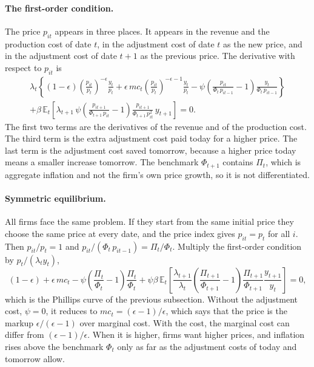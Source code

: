 \documentclass[11pt]{article}
\begin{document}
\paragraph{The first-order condition.} The price $p_{it}$ appears in three places. It appears in the revenue and the production cost of date $t$, in the adjustment cost of date $t$ as the new price, and in the adjustment cost of date $t+1$ as the previous price. The derivative with respect to $p_{it}$ is
\begin{multline*}
\lambda_t \left\{ (1-\epsilon) \left( \frac{p_{it}}{p_t} \right)^{-\epsilon} \frac{y_t}{p_t}
+ \epsilon\, mc_t \left( \frac{p_{it}}{p_t} \right)^{-\epsilon-1} \frac{y_t}{p_t}
- \psi \left( \frac{p_{it}}{\Phi_t\, p_{it-1}} - 1 \right) \frac{y_t}{\Phi_t\, p_{it-1}} \right\} \\
+ \beta\, \mathbb{E}_t \left[ \lambda_{t+1}\, \psi \left( \frac{p_{it+1}}{\Phi_{t+1}\, p_{it}} - 1 \right) \frac{p_{it+1}}{\Phi_{t+1}\, p_{it}^2}\, y_{t+1} \right] = 0 .
\end{multline*}
The first two terms are the derivatives of the revenue and of the production cost. The third term is the extra adjustment cost paid today for a higher price. The last term is the adjustment cost saved tomorrow, because a higher price today means a smaller increase tomorrow. The benchmark $\Phi_{t+1}$ contains $\Pi_t$, which is aggregate inflation and not the firm's own price growth, so it is not differentiated.

\paragraph{Symmetric equilibrium.} All firms face the same problem. If they start from the same initial price they choose the same price at every date, and the price index gives $p_{it} = p_t$ for all $i$. Then $p_{it}/p_t = 1$ and $p_{it}/(\Phi_t\, p_{it-1}) = \Pi_t/\Phi_t$. Multiply the first-order condition by $p_t/(\lambda_t y_t)$,
\begin{equation*}
(1-\epsilon) + \epsilon\, mc_t - \psi \left( \frac{\Pi_t}{\Phi_t} - 1 \right) \frac{\Pi_t}{\Phi_t}
+ \psi \beta\, \mathbb{E}_t \left[ \frac{\lambda_{t+1}}{\lambda_t} \left( \frac{\Pi_{t+1}}{\Phi_{t+1}} - 1 \right) \frac{\Pi_{t+1}}{\Phi_{t+1}} \frac{y_{t+1}}{y_t} \right] = 0,
\end{equation*}
which is the Phillips curve of the previous subsection. Without the adjustment cost, $\psi = 0$, it reduces to $mc_t = (\epsilon-1)/\epsilon$, which says that the price is the markup $\epsilon/(\epsilon-1)$ over marginal cost. With the cost, the marginal cost can differ from $(\epsilon-1)/\epsilon$. When it is higher, firms want higher prices, and inflation rises above the benchmark $\Phi_t$ only as far as the adjustment costs of today and tomorrow allow.
\end{document}
